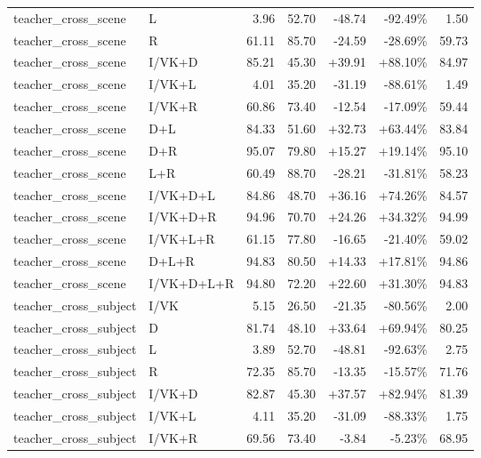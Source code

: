 \documentclass[UTF8,10pt,a4paper]{ctexart}
\newcommand{\better}[1]{\textcolor{ImpBlue}{#1}}
\newcommand{\worse}[1]{\textcolor{DropRed}{#1}}
\begin{document}
{\begin{longtable}{llrrrrr}
teacher\_cross\_scene & L & 3.96 & 52.70 & \worse{-48.74} & \worse{-92.49\%} & 1.50\\
teacher\_cross\_scene & R & 61.11 & 85.70 & \worse{-24.59} & \worse{-28.69\%} & 59.73\\
teacher\_cross\_scene & I/VK+D & 85.21 & 45.30 & \better{+39.91} & \better{+88.10\%} & 84.97\\
teacher\_cross\_scene & I/VK+L & 4.01 & 35.20 & \worse{-31.19} & \worse{-88.61\%} & 1.49\\
teacher\_cross\_scene & I/VK+R & 60.86 & 73.40 & \worse{-12.54} & \worse{-17.09\%} & 59.44\\
teacher\_cross\_scene & D+L & 84.33 & 51.60 & \better{+32.73} & \better{+63.44\%} & 83.84\\
teacher\_cross\_scene & D+R & 95.07 & 79.80 & \better{+15.27} & \better{+19.14\%} & 95.10\\
teacher\_cross\_scene & L+R & 60.49 & 88.70 & \worse{-28.21} & \worse{-31.81\%} & 58.23\\
teacher\_cross\_scene & I/VK+D+L & 84.86 & 48.70 & \better{+36.16} & \better{+74.26\%} & 84.57\\
teacher\_cross\_scene & I/VK+D+R & 94.96 & 70.70 & \better{+24.26} & \better{+34.32\%} & 94.99\\
teacher\_cross\_scene & I/VK+L+R & 61.15 & 77.80 & \worse{-16.65} & \worse{-21.40\%} & 59.02\\
teacher\_cross\_scene & D+L+R & 94.83 & 80.50 & \better{+14.33} & \better{+17.81\%} & 94.86\\
teacher\_cross\_scene & I/VK+D+L+R & 94.80 & 72.20 & \better{+22.60} & \better{+31.30\%} & 94.83\\
teacher\_cross\_subject & I/VK & 5.15 & 26.50 & \worse{-21.35} & \worse{-80.56\%} & 2.00\\
teacher\_cross\_subject & D & 81.74 & 48.10 & \better{+33.64} & \better{+69.94\%} & 80.25\\
teacher\_cross\_subject & L & 3.89 & 52.70 & \worse{-48.81} & \worse{-92.63\%} & 2.75\\
teacher\_cross\_subject & R & 72.35 & 85.70 & \worse{-13.35} & \worse{-15.57\%} & 71.76\\
teacher\_cross\_subject & I/VK+D & 82.87 & 45.30 & \better{+37.57} & \better{+82.94\%} & 81.39\\
teacher\_cross\_subject & I/VK+L & 4.11 & 35.20 & \worse{-31.09} & \worse{-88.33\%} & 1.75\\
teacher\_cross\_subject & I/VK+R & 69.56 & 73.40 & \worse{-3.84} & \worse{-5.23\%} & 68.95\\

\end{longtable}}
\end{document}
